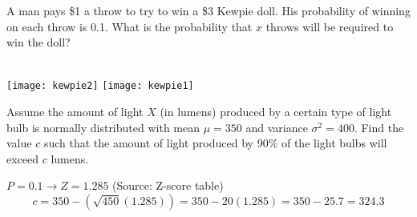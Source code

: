 \documentclass[answers]{exam}
\begin{document}
\begin{questions}
\clearpage
\question 
A man pays \$1 a throw to try to win a \$3 Kewpie doll. His probability of winning on each throw is 0.1. What is the probability that $x$ throws will be required to win the doll?
\begin{solution} \\
	\texttt{[image: kewpie2]}
	\hspace*{\fill}
	\hspace*{\fill}
	\texttt{[image: kewpie1]}
\end{solution}

\question 
Assume the amount of light $X$ (in lumens) produced by a certain type of light bulb is normally distributed with mean \(\mu=350\) and variance \(\sigma^2=400\). Find the value $c$ such that the amount of light produced by 90\% of the light bulbs will exceed $c$ lumens.
\begin{solution}
	\(P = 0.1 \rightarrow Z = 1.285\) (Source: Z-score table) \\
	\[c = 350 - (\sqrt{450}(1.285)) = 350 - 20(1.285) = 350 - 25.7 = 324.3\]
\end{solution}


\end{questions}
\end{document}
